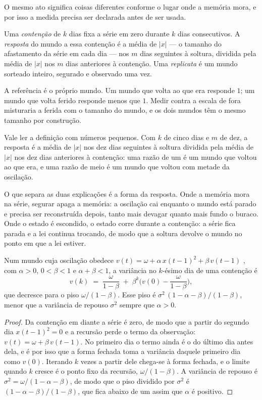 O mesmo ato significa coisas diferentes conforme o lugar onde a memória mora, e por isso a medida
precisa ser declarada antes de ser usada.

\begin{definicao}\label{def:resposta}
Uma \emph{contenção} de $k$ dias fixa a série em zero durante $k$ dias consecutivos. A
\emph{resposta} do mundo a essa contenção é a média de $|x|$ --- o tamanho do afastamento da série em
cada dia --- nos $m$ dias seguintes à soltura,
dividida pela média de $|x|$ nos $m$ dias anteriores à contenção. Uma \emph{replicata} é um mundo
sorteado inteiro, segurado e observado uma vez.
\end{definicao}

A referência é o próprio mundo. Um mundo que volta ao que era responde $1$; um mundo que volta
ferido responde menos que $1$. Medir contra a escala de fora misturaria a ferida com o tamanho do
mundo, e os dois mundos têm o mesmo tamanho por construção.

Vale ler a definição com números pequenos. Com $k$ de cinco dias e $m$ de dez, a resposta é a média
de $|x|$ nos dez dias seguintes à soltura dividida pela média de $|x|$ nos dez dias anteriores à
contenção: uma razão de um é um mundo que voltou ao que era, e uma razão de meio é um mundo que
voltou com metade da oscilação.

O que separa as duas explicações é a forma da resposta. Onde a memória mora na série, segurar apaga
a memória: a oscilação cai enquanto o mundo está parado e precisa ser reconstruída depois, tanto
mais devagar quanto mais fundo o buraco. Onde o estado é escondido, o estado corre durante a
contenção: a série fica parada e a lei continua trocando, de modo que a soltura devolve o mundo no
ponto em que a lei estiver.

\begin{proposicao}\label{prop:piso-contencao}
Num mundo cuja oscilação obedece $v(t) = \omega + \alpha\, x(t-1)^2 + \beta\, v(t-1)$
\cite{bollerslev1986generalized}, com $\alpha > 0$, $0 < \beta < 1$ e $\alpha+\beta < 1$, a variância no $k$-ésimo dia de uma contenção é
\[
v(k) \;=\; \frac{\omega}{1-\beta} \;+\; \beta^{k}\Big( v(0) - \frac{\omega}{1-\beta} \Big),
\]
que decresce para o piso $\omega/(1-\beta)$. Esse piso é $\sigma^{2}\,(1-\alpha-\beta)/(1-\beta)$,
menor que a variância de repouso $\sigma^{2}$ sempre que $\alpha > 0$.
\end{proposicao}

\begin{proof}
Da contenção em diante a série é zero, de modo que a partir do segundo dia $x(t-1)^2 = 0$ e a
recursão perde o termo da observação: $v(t) = \omega + \beta\, v(t-1)$. No primeiro dia o termo
ainda é o do último dia antes dela, e é por isso que a forma fechada toma a variância daquele
primeiro dia como $v(0)$. Iterando $k$ vezes a partir dele chega-se à forma fechada, e o limite quando $k$ cresce é o ponto fixo da recursão, $\omega/(1-\beta)$. A
variância de repouso é $\sigma^{2} = \omega/(1-\alpha-\beta)$, de modo que o piso dividido por
$\sigma^{2}$ é $(1-\alpha-\beta)/(1-\beta)$, que fica abaixo de um assim que $\alpha$ é positivo.
\end{proof}

